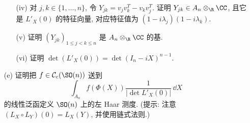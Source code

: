 \begin{exercise}[$\SO(n)$ 上的 Haar 测度]
\begin{enumerate}
\begin{enumerate}
\item[(iv)] 对 $j, k \in \{1, \ldots, n\}$, 令 $Y_{jk} = v_jv_k^T - v_kv_j^T$. 证明 $Y_{jk} \in A_n \otimes_{\R}\CC$, 且它是 $L'_X(0)$ 的特征向量, 对应特征值为 $(1 - i\lambda_j)(1 - i\lambda_k)$.
\item[(v)] 证明 $(Y_{jk})_{1 \leq j < k \leq n}$ 是 $A_n \otimes_{\R}\CC$ 的基.
\item[(vi)] 证明 $\det(L'_X(0)) = \det(I_n - iX)^{n-1}$.
\end{enumerate}
\item[(e)] 证明把 $f \in \mathcal{C}_c(\SO(n))$ 送到
\[
\int_{A_n}f(\Phi(X))\frac{1}{|\det L'_X(0)|}\,\dd X
\]
的线性泛函定义 $\SO(n)$ 上的左 Haar 测度. (提示: 注意 $(L_X \circ L_Y)(0) = L_X(Y)$, 并使用链式法则.)
\end{enumerate}
\end{exercise}

